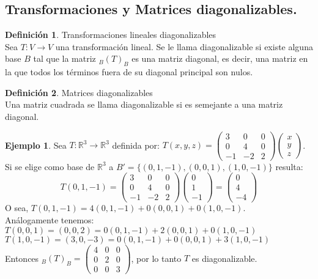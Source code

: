 \documentclass[10pt]{article}
\theoremstyle{definition}
\newtheorem{definition}{Definición}[section]
\newtheorem{example}{Ejemplo}[section]
\begin{document}
\subsection{Transformaciones y Matrices diagonalizables.}
\begin{definition}{Transformaciones lineales diagonalizables}
	\\Sea $T:V\to V$ una transformación lineal. Se le llama diagonalizable si existe alguna base $B$ tal que la matriz $_B(T)_B$ es una matriz diagonal, es decir, una matriz en la que todos los términos fuera de su diagonal principal son nulos.
\end{definition}
\begin{definition}{Matrices diagonalizables}
	\\Una matriz cuadrada se llama diagonalizable si es semejante a una matriz diagonal.
\end{definition}
\begin{example}
	Sea $T:\mathbb{R} ^3 \to\mathbb{R} ^3$ definida por: $T(x,y,z)=\begin{pmatrix} 3 & 0 & 0 \\ 0 & 4 & 0 \\ -1 & -2 & 2 \end{pmatrix} \begin{pmatrix} x \\ y \\ z \end{pmatrix} $.
	Si se elige como base de $\mathbb{R} ^3$ a $B'=\{(0,1,-1),(0,0,1),(1,0,-1)\}$ resulta:
	$$T(0,1,-1)=\begin{pmatrix} 3 & 0 & 0 \\ 0 & 4 & 0 \\ -1 & -2 & 2 \end{pmatrix} \begin{pmatrix} 0 \\ 1 \\ -1 \end{pmatrix}=\begin{pmatrix} 0 \\ 4 \\ -4 \end{pmatrix}$$
	O sea, $T(0,1,-1)=4(0,1,-1)+0(0,0,1)+0(1,0,-1)$.\\
	Análogamente tenemos:\\
	$T(0,0,1)=(0,0,2)=0(0,1,-1)+2(0,0,1)+0(1,0,-1)$\\
	$T(1,0,-1)=(3,0,-3)=0(0,1,-1)+0(0,0,1)+3(1,0,-1)$\\
	Entonces $_B(T)_B=\begin{pmatrix} 4&0&0 \\ 0&2&0 \\ 0&0&3 \end{pmatrix} $, por lo tanto $T$ es diagonalizable.
\end{example}
\end{document}

